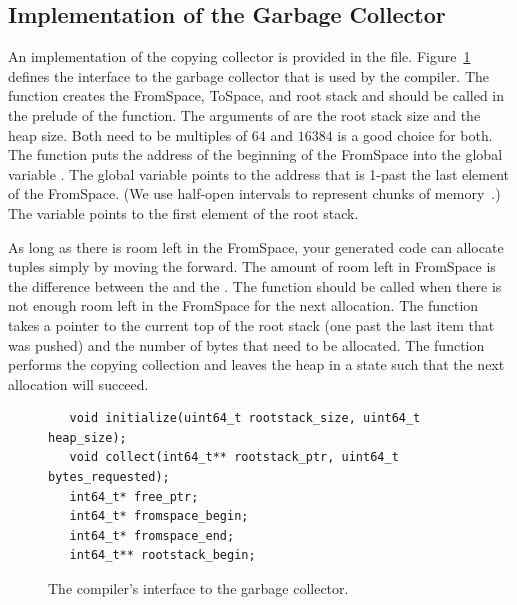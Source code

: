 \documentclass[11pt]{book}
\begin{document}
\subsection{Implementation of the Garbage Collector}
\label{sec:organize-gz}

An implementation of the copying collector is provided in the
 file. Figure~\ref{fig:gc-header} defines the
interface to the garbage collector that is used by the compiler. The
 function creates the FromSpace, ToSpace, and root
stack and should be called in the prelude of the 
function. The arguments of  are the root stack size
and the heap size. Both need to be multiples of $64$ and $16384$ is a
good choice for both.  The  function puts the address
of the beginning of the FromSpace into the global variable
. The global variable  points to
the address that is 1-past the last element of the FromSpace. (We use
half-open intervals to represent chunks of
memory~\citep{Dijkstra:1982aa}.)  The  variable
points to the first element of the root stack.

As long as there is room left in the FromSpace, your generated code
can allocate tuples simply by moving the  forward.
%
The amount of room left in FromSpace is the difference between the
 and the .  The 
function should be called when there is not enough room left in the
FromSpace for the next allocation.  The  function takes
a pointer to the current top of the root stack (one past the last item
that was pushed) and the number of bytes that need to be
allocated. The  function performs the copying collection
and leaves the heap in a state such that the next allocation will
succeed.

\begin{figure}[tbp]
\begin{lstlisting}
   void initialize(uint64_t rootstack_size, uint64_t heap_size);
   void collect(int64_t** rootstack_ptr, uint64_t bytes_requested);
   int64_t* free_ptr;
   int64_t* fromspace_begin;
   int64_t* fromspace_end;
   int64_t** rootstack_begin;
\end{lstlisting}
\caption{The compiler's interface to the garbage collector.}
\label{fig:gc-header}
\end{figure}
\end{document}
